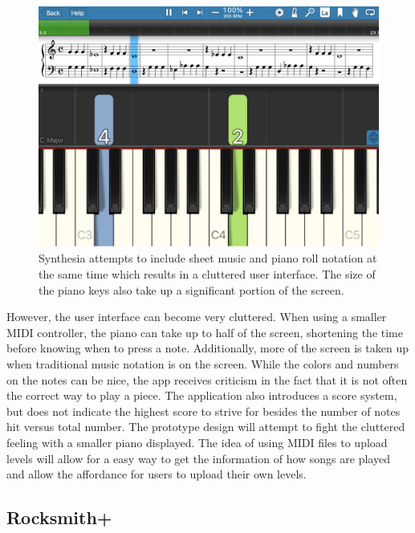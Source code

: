 \documentclass[10pt,twocolumn]{article}
\begin{document}
\begin{figure}
    \centering
    \includegraphics[width=.95\linewidth]{SynthesiaPlaying.png}
    \caption{
       Synthesia attempts to include sheet music and piano roll notation at the same time which results in a cluttered user interface. The size of the piano keys also take up a significant portion of the screen.
    }
    \label{fig:first-page}
\end{figure}


However, the user interface can become very cluttered. When using a smaller MIDI controller, the piano can take up to half of the screen, shortening the time before knowing when to press a note. Additionally, more of the screen is taken up when traditional music notation is on the screen. While the colors and numbers on the notes can be nice, the app receives criticism in the fact that it is not often the correct way to play a piece. The application also introduces a score system, but does not indicate the highest score to strive for besides the number of notes hit versus total number. The prototype design will attempt to fight the cluttered feeling with a smaller piano displayed. The idea of using MIDI files to upload levels will allow for a easy way to get the information of how songs are played and allow the affordance for users to upload their own levels.

\subsection{Rocksmith+}
\end{document}
